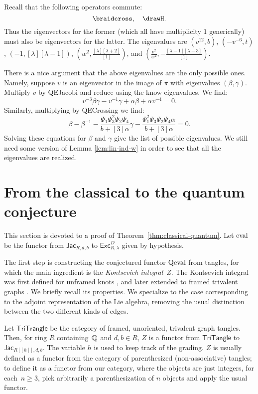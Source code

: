 \documentclass[12pt]{amsart}
\begin{document}
\begin{remark}
Recall that the following operators commute:
$$\braidcross,\quad\drawH.$$
Thus the eigenvectors for the former (which all have multiplicity $1$
generically) must also be eigenvectors for the latter.  The eigenvalues are
$(v^{12}, b)$, $(-v^{-6},t)$, $(-1, [\lambda][\lambda-1])$, $(w^2,
\frac{[\lambda][\lambda+2]}{[1]})$, and $(\frac{v^2}{w^2},
-\frac{[\lambda-1][\lambda-3]}{[1]})$.

There is a nice argument that the above eigenvalues are the only possible
ones.  Namely, suppose $v$ is an eigenvector in the image of $\pi$
with eigenvalues $(\beta, \gamma)$. Multiply $v$ by QEJacobi and reduce
using the know eigenvalues. We find:
$$v^{-3} \beta \gamma -v^{-1} \gamma + \alpha \beta + \alpha v^{-4} = 0.$$
Similarly, multiplying by QECrossing we find:
$$\beta-\beta^{-1} - \frac{\Psi_1 \Psi_3^2 \Psi_2 \Psi_4}{b+[3]\alpha} \gamma - \frac{\Psi_1^2 \Psi_3 \Psi_2 \Psi_4 \alpha}{b+[3]\alpha} = 0.$$
Solving these equations for $\beta$ and $\gamma$ give the list of possible eigenvalues.  We still need some version of Lemma \ref{lem:lin-ind-w} in order to see that all the eigenvalues are realized.
\end{remark}



\section{From the classical to the quantum conjecture}
\label{sec:classical-quantum}
This section is devoted to a proof of
Theorem~\ref{thm:classical-quantum}. Let $\operatorname{eval}$ be the functor from
$\mathsf{Jac}_{R,d,b}$ to $\mathsf{Exc}^D_{R,\lambda}$ given by hypothesis.

The first step is constructing the conjectured functor $\operatorname{Qeval}$ from tangles,
for which the main ingredient is the \emph{Kontsevich integral}~$Z$. The
Kontsevich integral was first defined for unframed knots \cite{MR1318886}, and
later extended to framed trivalent graphs
\cite{MR1473309,MR2304469,MR2661529}. We briefly recall its properties. We
specialize to the case corresponding to the adjoint representation of the Lie
algebra, removing the usual distinction between the two different kinds of
edges.

Let $\mathsf{TriTrangle}$ be the category of framed, unoriented, trivalent
graph tangles.  Then, for ring
$R$ containing~$\mathbb Q$ and $d,b \in R$, $Z$ is a functor from
$\mathsf{TriTangle}$ to $\mathsf{Jac}_{R[[h]],d,b}$. The variable $h$
is used to keep track of
the grading. $Z$ is usually defined as a functor from the category of
parenthesized (non-associative) tangles; to define it as a functor from our
category, where the objects are just integers, for each~$n \ge 3$, pick
arbitrarily a parenthesization of $n$ objects and apply the usual functor.
\end{document}
